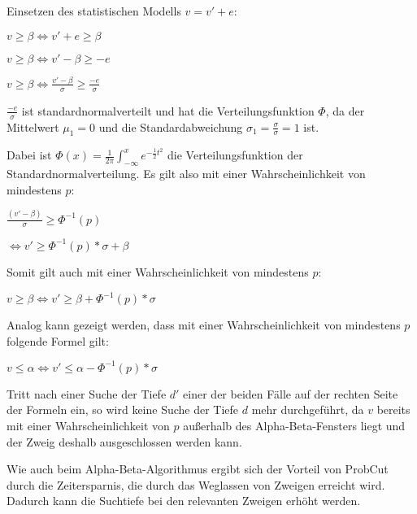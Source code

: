 Einsetzen des statistischen Modells $v=v'+e$:

\hspace*{1.3cm}
$v\geq\beta\iff v'+e\geq\beta$

\hspace*{1.3cm}
$v\geq\beta\iff v'-\beta\geq -e$

\hspace*{1.3cm}
$v\geq\beta\iff \frac{v'-\beta}{\sigma}\geq \frac{-e}{\sigma}$

$\frac{-e}{\sigma}$ ist standardnormalverteilt und hat die Verteilungsfunktion $\Phi$, da der Mittelwert $\mu_1=0$ und
die Standardabweichung $\sigma_1=\frac{\sigma}{\sigma}=1$ ist.

Dabei ist $\Phi(x)=\frac{1}{2\pi}\int_{-\infty}^xe^{-\frac{1}{2}t^2}$ die Verteilungsfunktion der
Standardnormalverteilung. Es gilt also mit einer Wahrscheinlichkeit von mindestens $p$:

\hspace*{1.3cm}
$\frac{(v'-\beta)}{\sigma}\geq\Phi^{-1}(p)$

\hspace*{1.3cm}
$\iff v'\geq\Phi^{-1}(p)*\sigma+\beta$

Somit gilt auch mit einer Wahrscheinlichkeit von mindestens $p$:

\hspace*{1.3cm}
\(v\geq\beta \iff v'\geq\beta+\Phi^{-1}(p)*\sigma\)

Analog kann gezeigt werden, dass mit einer Wahrscheinlichkeit von mindestens $p$ folgende Formel gilt:

\hspace*{1.3cm}
\(v\leq\alpha \iff v'\leq\alpha-\Phi^{-1}(p)*\sigma\)


Tritt nach einer Suche der Tiefe \(d'\) einer der beiden Fälle auf der rechten Seite der Formeln ein, so wird keine Suche der Tiefe
\(d\) mehr durchgeführt, da \(v\) bereits mit einer Wahrscheinlichkeit von \(p\) außerhalb des Alpha-Beta-Fensters liegt
und der Zweig deshalb ausgeschlossen werden kann.

Wie auch beim Alpha-Beta-Algorithmus ergibt sich der Vorteil von ProbCut durch die Zeitersparnis, die durch das
Weglassen von Zweigen erreicht wird. Dadurch kann die Suchtiefe bei den relevanten Zweigen erhöht werden.
\cite[S.~1]{probcut}
